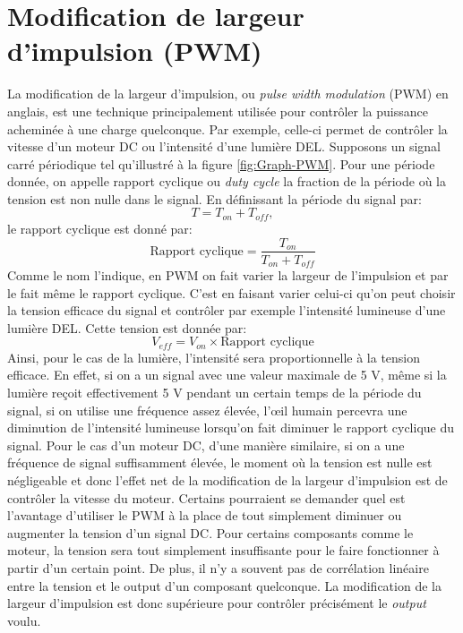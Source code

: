 \documentclass[canadien,12pt,oneside,letterpaper]{article}
\begin{document}
\section{Modification de largeur d'impulsion (PWM)}
La modification de la largeur d'impulsion, ou \textit{pulse width modulation} (PWM) en anglais, est une technique principalement utilisée pour contrôler la puissance acheminée à une charge quelconque. Par exemple, celle-ci permet de contrôler la vitesse d'un moteur DC ou l'intensité d'une lumière DEL. Supposons un signal carré périodique tel qu'illustré à la figure \ref{fig:Graph-PWM}. Pour une période donnée, on appelle rapport cyclique ou \textit{duty cycle} la fraction de la période où la tension est non nulle dans le signal. En définissant la période du signal par:
$$T = T_{on} + T_{off},$$
le rapport cyclique est donné par:
$$\text{Rapport cyclique} = \frac{T_{on}}{T_{on} + T_{off}}$$
Comme le nom l'indique, en PWM on fait varier la largeur de l'impulsion et par le fait même le rapport cyclique. C'est en faisant varier celui-ci qu'on peut choisir la tension efficace du signal et contrôler par exemple l'intensité lumineuse d'une lumière DEL. Cette tension est donnée par:
$$V_{eff} = V_{on} \times \text{Rapport cyclique}$$
Ainsi, pour le cas de la lumière, l'intensité sera proportionnelle à la tension efficace. En effet, si on a un signal avec une valeur maximale de 5 V, même si la lumière reçoit effectivement 5 V pendant un certain temps de la période du signal, si on utilise une fréquence assez élevée, l'œil humain percevra une diminution de l'intensité lumineuse lorsqu'on fait diminuer le rapport cyclique du signal. Pour le cas d'un moteur DC, d'une manière similaire, si on a une fréquence de signal suffisamment élevée, le moment où la tension est nulle est négligeable et donc l'effet net de la modification de la largeur d'impulsion est de contrôler la vitesse du moteur. Certains pourraient se demander quel est l'avantage d'utiliser le PWM à la place de tout simplement diminuer ou augmenter la tension d'un signal DC. Pour certains composants comme le moteur, la tension sera tout simplement insuffisante pour le faire fonctionner à partir d'un certain point. De plus, il n'y a souvent pas de corrélation linéaire entre la tension et le output d'un composant quelconque. La modification de la largeur d'impulsion est donc supérieure pour contrôler précisément le \textit{output} voulu.\\ 
\end{document}
